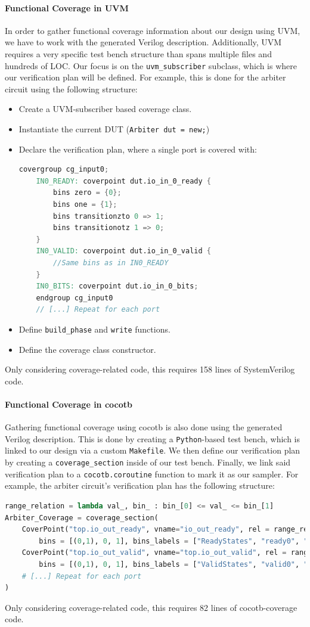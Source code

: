 \documentclass[conference]{IEEEtran}
\begin{document}
\paragraph{Functional Coverage in UVM} In order to gather functional coverage information about our design using UVM, we have to work with the generated Verilog description.
Additionally, UVM requires a very specific test bench structure than spans multiple files and hundreds of LOC.
Our focus is on the \texttt{uvm\_subscriber} subclass, which is where our verification plan will be defined.
For example, this is done for the arbiter circuit using the following structure:
\begin{itemize}
    \item Create a UVM-subscriber based coverage class.
    \item Instantiate the current DUT (\texttt{Arbiter dut = new;})
    \item Declare the verification plan, where a single port is covered with: 
    \begin{lstlisting}[language=verilog]
	covergroup cg_input0;
	IN0_READY: coverpoint dut.io_in_0_ready {
		bins zero = {0};
		bins one = {1};
		bins transitionzto 0 => 1;
		bins transitionotz 1 => 0;
	}
	IN0_VALID: coverpoint dut.io_in_0_valid {
		//Same bins as in IN0_READY
	}
	IN0_BITS: coverpoint dut.io_in_0_bits;
	endgroup cg_input0
	// [...] Repeat for each port
    \end{lstlisting}
    \item Define \texttt{build\_phase} and \texttt{write} functions.
    \item Define the coverage class constructor.
\end{itemize}  
Only considering coverage-related code, this requires 158 lines of SystemVerilog code. 

\paragraph{Functional Coverage in cocotb} Gathering functional coverage using cocotb is also done using the generated Verilog description.
This is done by creating a \texttt{Python}-based test bench, which is linked to our design via a custom \texttt{Makefile}.
We then define our verification plan by creating a \texttt{coverage\_section} inside of our test bench.
Finally, we link said verification plan to a \texttt{cocotb.coroutine} function to mark it as our sampler.
For example, the arbiter circuit's verification plan has the following structure:
 \begin{lstlisting}[language=Python]
 range_relation = lambda val_, bin_ : bin_[0] <= val_ <= bin_[1]
Arbiter_Coverage = coverage_section(
    CoverPoint("top.io_out_ready", vname="io_out_ready", rel = range_relation, 
        bins = [(0,1), 0, 1], bins_labels = ["ReadyStates", "ready0", "ready1"]),
    CoverPoint("top.io_out_valid", vname="top.io_out_valid", rel = range_relation, 
        bins = [(0,1), 0, 1], bins_labels = ["ValidStates", "valid0", "valid1"]),
    # [...] Repeat for each port
)
 \end{lstlisting}
 Only considering coverage-related code, this requires 82 lines of cocotb-coverage code.
 
\end{document}

